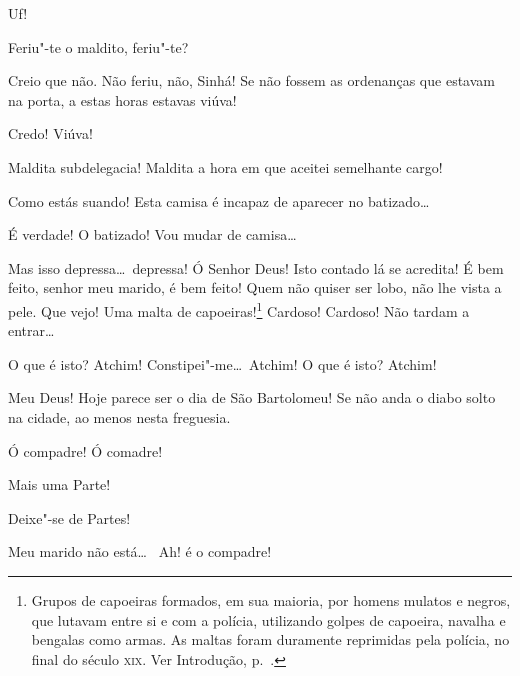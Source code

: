   Uf!

  Feriu"-te o maldito, feriu"-te?

 Creio que não.  Não feriu, não, Sinhá!
Se não fossem as ordenanças que estavam na
porta, a estas horas estavas viúva!

 Credo! Viúva!

 Maldita subdelegacia! Maldita a hora em que aceitei semelhante
cargo!

 Como estás suando! Esta camisa é incapaz de aparecer no
batizado\ldots

 É verdade! O batizado! Vou mudar de camisa\ldots

 Mas isso depressa\ldots\ depressa!  Ó Senhor Deus! Isto contado lá se acredita!
É bem feito, senhor meu marido, é bem feito! Quem não quiser ser
lobo, não lhe vista a pele.  Que vejo! Uma
malta de capoeiras!\footnote{ Grupos de capoeiras formados, em sua maioria, por homens
mulatos e negros, que lutavam entre si e com a polícia, utilizando golpes de
capoeira, navalha e bengalas como armas. As maltas foram duramente reprimidas
pela polícia, no final do século \textsc{xix}. Ver Introdução, p.~\pageref{capoeira}.} Cardoso! Cardoso! Não
tardam a entrar\ldots

  
O que é isto?  Atchim!
Constipei"-me\ldots\ Atchim! O que é isto? Atchim! 




 Meu Deus! Hoje parece ser o dia de São Bartolomeu! Se não anda
o diabo solto na cidade, ao menos
nesta freguesia.

 
Ó compadre! Ó comadre!

 Mais uma Parte!

 Deixe"-se de Partes!

 Meu marido não está\ldots\  Ah! é o compadre!

